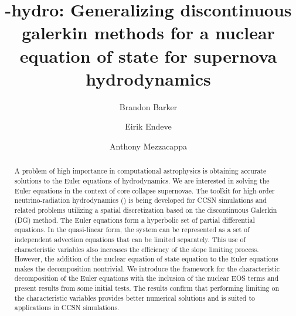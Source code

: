 \documentclass[onecolumn]{aastex62}
\begin{document}
\title{\thornado-hydro: Generalizing discontinuous galerkin methods for a nuclear
equation of state for supernova hydrodynamics}
\author{Brandon Barker}

\author{Eirik Endeve}

\author{Anthony Mezzacappa}


\begin{abstract}
A problem of high importance in computational astrophysics is obtaining accurate
solutions to the Euler equations of hydrodynamics. We are interested in solving
the Euler equations in the context of core collapse supernovae.
The toolkit for high-order neutrino-radiation hydrodynamics (\thornado)
is being developed for CCSN simulations and related problems utilizing a spatial discretization
based on the discontinuous Galerkin (DG) method.
The Euler equations form a hyperbolic set of partial differential equations.
In the quasi-linear form, the system can be represented
as a set of independent advection equations that can be limited separately.
This use of characteristic variables also increases the efficiency of the slope
limiting process. However, the addition of the nuclear equation of state equation
to the Euler equations makes the decomposition nontrivial.
We introduce the framework for the characteristic decomposition of the Euler equations
with the inclusion of the nuclear EOS terms and
present results from some initial tests. The results confirm that performing limiting
on the characteristic variables provides better numerical solutions and is
suited to applications in CCSN simulations.
\end{abstract}

\end{document}
